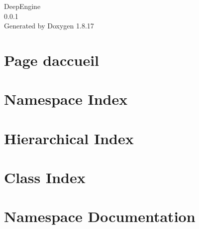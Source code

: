 \let\mypdfximage\pdfximage\def\pdfximage{\immediate\mypdfximage}\documentclass[twoside]{book}
\newcommand{\+}{\discretionary{\mbox{\scriptsize$\hookleftarrow$}}{}{}}
\newcommand{\clearemptydoublepage}{%
  \newpage{\pagestyle{empty}\cleardoublepage}%
}
\begin{document}
\hypersetup{pageanchor=false,
             bookmarksnumbered=true,
             pdfencoding=unicode
            }
\begin{titlepage}
\vspace*{7cm}
\begin{center}%
{\Large Deep\+Engine \\[1ex]\large 0.\+0.\+1 }\\
\vspace*{1cm}
{\large Generated by Doxygen 1.8.17}\\
\end{center}
\end{titlepage}
\clearemptydoublepage
{}
\tableofcontents
\clearemptydoublepage
{}
\hypersetup{pageanchor=true}

\chapter{Page d\textquotesingle{}accueil}
\label{index}\hypertarget{index}{}
\chapter{Namespace Index}

\chapter{Hierarchical Index}

\chapter{Class Index}

\chapter{Namespace Documentation}

\end{document}
